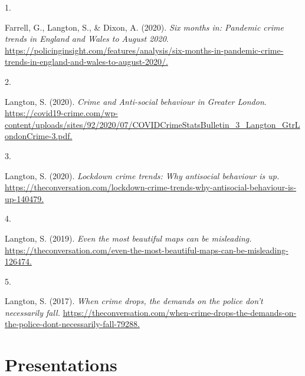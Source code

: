 \documentclass[10pt,a4paper,]{article}
\newlength{\cslhangindent}
\newlength{\csllabelwidth}
\newenvironment{CSLReferences}[2] %
 {\begin{list}{}{%
  \setlength{\itemindent}{0pt}
  \setlength{\leftmargin}{0pt}
  \setlength{\parsep}{0pt}
  \ifodd #1
   \setlength{\leftmargin}{\cslhangindent}
   \setlength{\itemindent}{-1\cslhangindent}
  \fi
  \setlength{\itemsep}{#2\baselineskip}}}
 {\end{list}}
\newcommand{\CSLLeftMargin}[1]{\parbox[t]{\csllabelwidth}{\strut#1\strut}}
\newcommand{\CSLRightInline}[1]{\parbox[t]{\linewidth - \csllabelwidth}{\strut#1\strut}}
\begin{document}
\hypertarget{refs-acd3d2f20247c35a4e4afc08d3e11a95}{}
\begin{CSLReferences}{0}{0}
\leavevmode{}%
\CSLLeftMargin{1. }%
\CSLRightInline{Farrell, G., Langton, S., \& Dixon, A. (2020). \emph{Six
months in: Pandemic crime trends in England and Wales to August 2020}.
\url{https://policinginsight.com/features/analysis/six-months-in-pandemic-crime-trends-in-england-and-wales-to-august-2020/.}}

\leavevmode{}%
\CSLLeftMargin{2. }%
\CSLRightInline{Langton, S. (2020). \emph{Crime and Anti-social
behaviour in Greater London}.
\url{https://covid19-crime.com/wp-content/uploads/sites/92/2020/07/COVIDCrimeStatsBulletin_3_Langton_GtrLondonCrime-3.pdf.}}

\leavevmode{}%
\CSLLeftMargin{3. }%
\CSLRightInline{Langton, S. (2020). \emph{Lockdown crime trends: Why
antisocial behaviour is up.}
\url{https://theconversation.com/lockdown-crime-trends-why-antisocial-behaviour-is-up-140479.}}

\leavevmode{}%
\CSLLeftMargin{4. }%
\CSLRightInline{Langton, S. (2019). \emph{Even the most beautiful maps
can be misleading.}
\url{https://theconversation.com/even-the-most-beautiful-maps-can-be-misleading-126474.}}

\leavevmode{}%
\CSLLeftMargin{5. }%
\CSLRightInline{Langton, S. (2017). \emph{When crime drops, the demands
on the police don't necessarily fall.}
\url{https://theconversation.com/when-crime-drops-the-demands-on-the-police-dont-necessarily-fall-79288.}}

\end{CSLReferences}

\hypertarget{presentations}{%
\section{Presentations}\label{presentations}}
\end{document}
